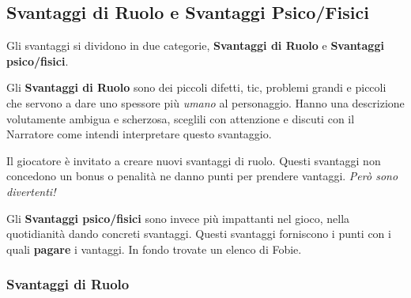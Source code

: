 \documentclass[a4paper,twoside,openany]{book}
\begin{document}
\begin{multicols}{2}
\subsection{Svantaggi di Ruolo e Svantaggi Psico/Fisici}\hypertarget{svantaggi}{}\label{svantaggidiruolo}

Gli svantaggi si dividono in due categorie, \textbf{Svantaggi di Ruolo} e \textbf{Svantaggi psico/fisici}.

Gli \textbf{Svantaggi di Ruolo} sono dei piccoli difetti, tic, problemi grandi e piccoli che servono a dare uno spessore più \emph{umano} al personaggio. Hanno una descrizione volutamente ambigua e scherzosa, sceglili con attenzione e discuti con il Narratore come intendi interpretare questo svantaggio.

Il giocatore è invitato a creare nuovi svantaggi di ruolo. Questi svantaggi non concedono un bonus o penalità ne danno punti per prendere vantaggi. \emph{Però sono divertenti!}

\bigskip

Gli \textbf{Svantaggi psico/fisici} sono invece più impattanti nel gioco, nella quotidianità dando concreti svantaggi. Questi svantaggi forniscono i punti con i quali \textbf{pagare} i vantaggi. In fondo trovate un elenco di Fobie.

\end{multicols}

\pagebreak

\subsubsection{Svantaggi di Ruolo}
\end{document}
